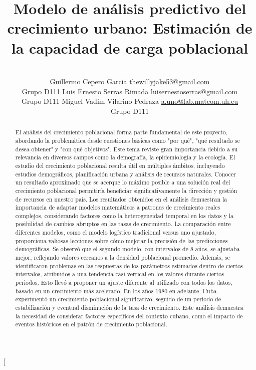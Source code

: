 \documentclass[a4paper,10pt,twocolumn]{article}
\title{Modelo de análisis predictivo del crecimiento urbano: Estimación de la capacidad de carga poblacional}
\author{\\
\name Guillermo Cepero Garcia \email \href{mailto:thewillyjake53@gmail.com}{thewillyjake53@gmail.com}
	\\ \addr Grupo D111 \AND
\name Luis Ernesto Serras Rimada \email \href{mailto:luisernestoserras@gmail.com}{luisernestoserras@gmail.com}
  \\ \addr Grupo D111 \AND
\name Miguel Vadim Vilarino Pedraza \email \href{mailto:a.uno@lab.matcom.uh.cu}{a.uno@lab.matcom.uh.cu}
	\\ \addr Grupo D111}
\begin{document}
\twocolumn[

\maketitle


\begin{abstract}

	El análisis del crecimiento poblacional forma parte fundamental de este proyecto, abordando la problemática desde cuestiones básicas como "por qué", "qué resultado se desea obtener" y "con qué objetivos". 
	Este tema reviste gran importancia debido a su relevancia en diversos campos como la demografía, la epidemiología y la ecología. El estudio del crecimiento poblacional resulta útil en múltiples ámbitos, incluyendo estudios demográficos, planificación urbana y análisis de recursos naturales. Conocer un resultado aproximado que se acerque lo máximo posible a una solución real del crecimiento poblacional permitiría beneficiar significativamente la dirección y gestión de recursos en nuestro país. Los resultados obtenidos en el análisis demuestran la importancia de adaptar modelos matemáticos a patrones de crecimiento reales complejos, considerando factores como la heterogeneidad temporal en los datos y la posibilidad de cambios abruptos en las tasas de crecimiento. La comparación entre diferentes modelos, como el modelo logístico tradicional versus uno ajustado, proporciona valiosas lecciones sobre cómo mejorar la precisión de las predicciones demográficas. Se observó que el segundo modelo, con intervalos de 8 años, se ajustaba mejor, reflejando valores cercanos a la densidad poblacional promedio. Además, se identificaron problemas en las respuestas de los parámetros estimados dentro de ciertos intervalos, atribuidos a una tendencia casi vertical en los valores durante ciertos periodos. Esto llevó a proponer un ajuste diferente al utilizado con todos los datos, basado en un crecimiento más acelerado. En los años 1980 en adelante, Cuba experimentó un crecimiento poblacional significativo, seguido de un período de estabilización y eventual disminución de la tasa de crecimiento. Este análisis demuestra la necesidad de considerar factores específicos del contexto cubano, como el impacto de eventos históricos en el patrón de crecimiento poblacional.

\end{abstract}
\end{document}
